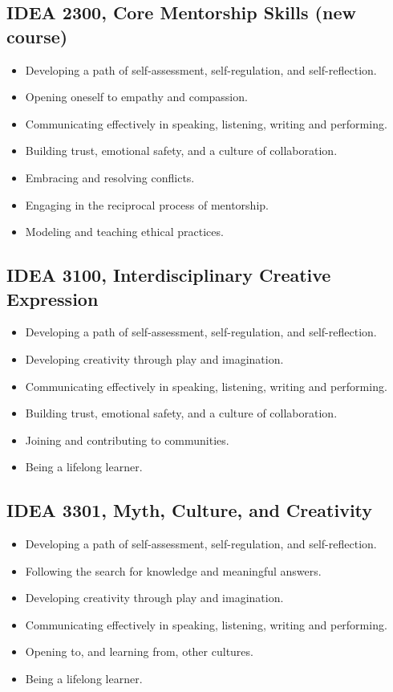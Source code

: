 \documentclass[letterpaper,10pt,headsepline]{scrreprt}
\begin{document}
\subsection{IDEA 2300, Core Mentorship Skills (new course)}

\begin{itemize}
\itemsep1pt\parskip0pt
\item
  Developing a path of self-assessment, self-regulation, and
  self-reflection.
\item
  Opening oneself to empathy and compassion.
\item
  Communicating effectively in speaking, listening, writing and
  performing.
\item
  Building trust, emotional safety, and a culture of collaboration.
\item
  Embracing and resolving conflicts.
\item
  Engaging in the reciprocal process of mentorship.
\item
  Modeling and teaching ethical practices.
\end{itemize}

\subsection{IDEA 3100, Interdisciplinary Creative Expression}

\begin{itemize}
\itemsep1pt\parskip0pt
\item
  Developing a path of self-assessment, self-regulation, and
  self-reflection.
\item
  Developing creativity through play and imagination.
\item
  Communicating effectively in speaking, listening, writing and
  performing.
\item
  Building trust, emotional safety, and a culture of collaboration.
\item
  Joining and contributing to communities.
\item
  Being a lifelong learner.
\end{itemize}

\subsection{IDEA 3301, Myth, Culture, and Creativity}

\begin{itemize}
\itemsep1pt\parskip0pt
\item
  Developing a path of self-assessment, self-regulation, and
  self-reflection.
\item
  Following the search for knowledge and meaningful answers.
\item
  Developing creativity through play and imagination.
\item
  Communicating effectively in speaking, listening, writing and
  performing.
\item
  Opening to, and learning from, other cultures.
\item
  Being a lifelong learner.
\end{itemize}
\end{document}
